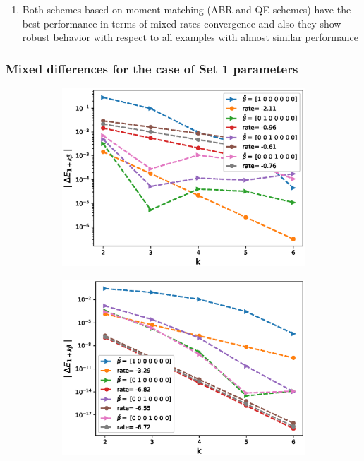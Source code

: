 \begin{enumerate}
\item  Both schemes based on moment matching (ABR and QE schemes) have the best performance in terms of mixed rates convergence and also they show robust behavior with respect to all examples with almost similar performance
\end{enumerate}
 
 \subsubsection*{Mixed differences for the case of Set 1 parameters}
\FloatBarrier
\begin{figure}[htb]
	\centering %
	\begin{subfigure}{0.4\textwidth}
		\includegraphics[width=\linewidth]{./figures/Heston_single_call_full_truncation_vol/mixed_rates/set2/N_4/first_difference_heston_4steps_hierarchical_2}
		\caption{}
		\label{fig:1}
	\end{subfigure}\hfil %
	\begin{subfigure}{0.4\textwidth}
		\includegraphics[width=\linewidth]{./figures/Heston_single_call_ABR_moment_matching/mixed_rates/set2/N_4/first_difference_heston_4steps_hierarchical}

\end{subfigure}
\end{figure}

